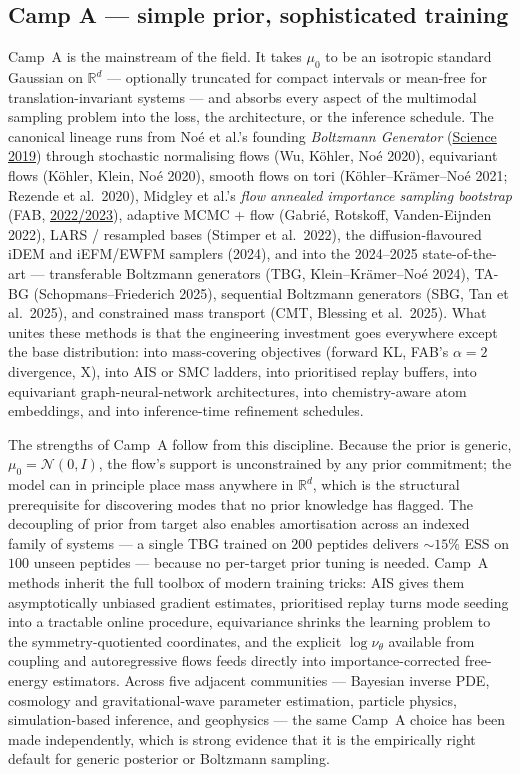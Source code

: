 \documentclass[11pt,letterpaper]{article}
\newcommand{\Real}{\mathbb{R}}
\newcommand{\Xfun}{\mathrm{X}}
\theoremstyle{plain}
\begin{document}
\subsection*{Camp A --- simple prior, sophisticated training}

Camp~A is the mainstream of the field. It takes $\mu_0$ to be an isotropic
standard Gaussian on $\Real^d$ --- optionally truncated for compact intervals
or mean-free for translation-invariant systems --- and absorbs every aspect
of the multimodal sampling problem into the loss, the architecture, or the
inference schedule. The canonical lineage runs from Noé et al.'s founding
\emph{Boltzmann Generator}
(\href{https://www.science.org/doi/10.1126/science.aaw1147}{Science 2019})
through stochastic normalising flows (Wu, Köhler, Noé 2020), equivariant
flows (Köhler, Klein, Noé 2020), smooth flows on tori (Köhler--Krämer--Noé
2021; Rezende et al.\ 2020), Midgley et al.'s \emph{flow annealed importance
sampling bootstrap} (FAB,
\href{https://arxiv.org/abs/2208.01893}{2022/2023}), adaptive MCMC + flow
(Gabrié, Rotskoff, Vanden-Eijnden 2022), LARS / resampled bases (Stimper et
al.\ 2022), the diffusion-flavoured iDEM and iEFM/EWFM samplers (2024), and
into the 2024--2025 state-of-the-art --- transferable Boltzmann generators
(TBG, Klein--Krämer--Noé 2024), TA-BG (Schopmans--Friederich 2025),
sequential Boltzmann generators (SBG, Tan et al.\ 2025), and constrained
mass transport (CMT, Blessing et al.\ 2025). What unites these methods is
that the engineering investment goes everywhere except the base
distribution: into mass-covering objectives (forward KL, FAB's
$\alpha=2$ divergence, $\Xfun$), into AIS or SMC ladders, into prioritised
replay buffers, into equivariant graph-neural-network architectures, into
chemistry-aware atom embeddings, and into inference-time refinement
schedules.

The strengths of Camp~A follow from this discipline. Because the prior is
generic, $\mu_0=\mathcal N(0,I)$, the flow's support is unconstrained by
any prior commitment; the model can in principle place mass anywhere in
$\Real^d$, which is the structural prerequisite for discovering modes that
no prior knowledge has flagged. The decoupling of prior from target also
enables amortisation across an indexed family of systems --- a single TBG
trained on $200$ peptides delivers ${\sim}15\%$ ESS on $100$ unseen
peptides --- because no per-target prior tuning is needed. Camp~A methods
inherit the full toolbox of modern training tricks: AIS gives them
asymptotically unbiased gradient estimates, prioritised replay turns mode
seeding into a tractable online procedure, equivariance shrinks the
learning problem to the symmetry-quotiented coordinates, and the explicit
$\log\nu_\theta$ available from coupling and autoregressive flows feeds
directly into importance-corrected free-energy estimators. Across five
adjacent communities --- Bayesian inverse PDE, cosmology and
gravitational-wave parameter estimation, particle physics, simulation-based
inference, and geophysics --- the same Camp~A choice has been made
independently, which is strong evidence that it is the empirically right
default for generic posterior or Boltzmann sampling.
\end{document}
